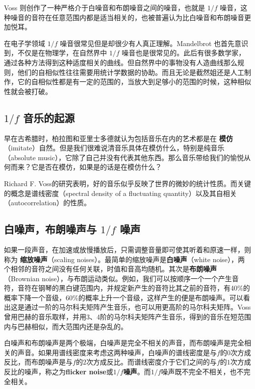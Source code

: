 \documentclass[11pt]{article}
\begin{document}
Voss 则创作了一种严格介于白噪音和布朗噪音之间的噪音，也就是 $1/f$ 噪音，这种噪音的音符在任意范围内都是适当相关的，也被普遍认为比白噪音和布朗噪音更加悦耳。

在电子学领域 $1/f$ 噪音很常见但是却很少有人真正理解。Mandelbrot 也首先意识到，不仅是在物理学，在自然界中 $1/f$ 噪音也是很常见的。此后有很多数学家，通过各种方法得到这种适度相关的曲线。但自然界中的事物没有人造曲线那么规则，他们的自相似性往往需要用统计学数据的协助。而且无论是截然姐还是人工制作，它的自相似性都是有一定的范围的，当放大到足够小的范围的时候，这种相似性就会被打破。

\subsection{$1/f$ 音乐的起源}
早在古希腊时，柏拉图和亚里士多德就认为包括音乐在内的艺术都是在 \textbf{模仿}（imitate）自然。但是我们很难说清音乐具体在模仿什么，特别是纯音乐（absolute music），它除了自己并没有代表其他东西。那么音乐带给我们的愉悦从何而来？它是否在模仿，如果是的话是在模仿什么？

Richard F. Voss的研究表明，好的音乐似乎反映了世界的微妙的统计性质。而关键的概念是谱线密度（spectral density of a fluctuating quantity）以及其自相关（autocorrelation）的性质。

\subsection{白噪声，布朗噪声与 $1/f$ 噪声}
如果一段声音，在加速或放慢播放后，只需调整音量即可使其听着和原速一样，则称为 \textbf{缩放噪声}（scaling noises）。最简单的缩放噪声是\textbf{白噪声}（white noise），两个相邻的音符之间没有任何关联，时值和音高均随机。其次是\textbf{布朗噪声}（Brownian noise），与布朗运动类似。例如，我们可以按顺序一个一个产生音符，音符在钢琴的黑白键范围内，并规定新产生的音符比其之前的音符，有40\%的概率下降一个音级，60\%的概率上升一个音级，这样产生的便是布朗噪声。可以看出这是通过一阶的马尔科夫矩阵产生音乐，也可以用更高阶的马尔科夫矩阵。Voss曾用巴赫的音乐取样，并用3、4阶的马尔科夫矩阵产生音乐，得到的音乐在短范围内与巴赫相似，而大范围内还是杂乱的。

白噪声和布朗噪声是两个极端，白噪声是完全不相关的声音，而布朗噪声是完全相关的声音。如果用谱线密度来考虑这两种噪声，白噪声的谱线密度是与$f$的$0$次方成反比，而布朗噪声是与$f$的$2$次方成反比。而谱线密度介于它们之间的与$f$的$1$次方成反比的噪声，称之为\textbf{flicker noise}或\textbf{$1/f$噪声}。而$1/f$噪声既不完全不相关，也不完全相关。
\end{document}
